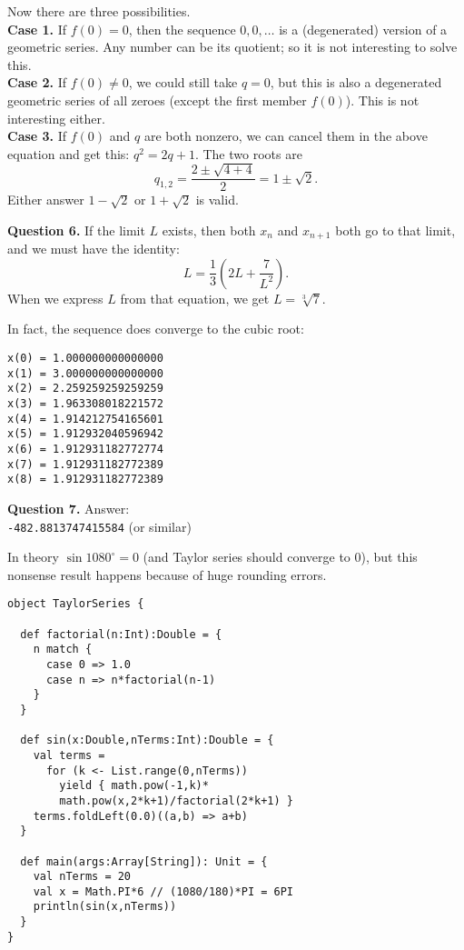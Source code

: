 \documentclass[jou]{apa6}
\begin{document}
Now there are three possibilities.\\
{\bf Case 1.} If $f(0) = 0$, then the sequence 
$0,0,\ldots$ is a (degenerated) version of a geometric series. 
Any number can be its quotient; so it is not interesting to solve this.\\
{\bf Case 2.} If $f(0) \neq 0$, we could still take $q = 0$, but this
is also a degenerated geometric series of all zeroes (except the first member $f(0)$).
This is not interesting either.\\
{\bf Case 3.} If $f(0)$ and $q$ are both nonzero, we can cancel them in the
above equation and get this: $q^2 = 2q + 1$. 
The two roots are 
$$q_{1,2} = \frac{2 \pm \sqrt{4 + 4}}{2} = 1 \pm \sqrt{2}.$$
Either answer $1 - \sqrt{2}$ or $1 + \sqrt{2}$ is valid. 




\vspace{6pt}
{\bf Question 6.} If the limit $L$ exists, then both $x_n$ and $x_{n+1}$ both 
go to that limit, and we must have the identity:
$$L = \frac{1}{3}\left( 2L + \frac{7}{L^2} \right).$$
When we express $L$ from that equation, we get $L = \sqrt[3]{7}$. 

In fact, the sequence does converge to the cubic root: 
\begin{verbatim}
x(0) = 1.000000000000000
x(1) = 3.000000000000000
x(2) = 2.259259259259259
x(3) = 1.963308018221572
x(4) = 1.914212754165601
x(5) = 1.912932040596942
x(6) = 1.912931182772774
x(7) = 1.912931182772389
x(8) = 1.912931182772389
\end{verbatim}


\vspace{6pt}
{\bf Question 7.} Answer:\\ {\tt -482.8813747415584} (or similar)

In theory $\sin 1080^{\circ} = 0$ (and Taylor series should converge to $0$), 
but this nonsense result happens because of huge rounding errors.

{\footnotesize
\begin{verbatim}
object TaylorSeries {

  def factorial(n:Int):Double = {
    n match {
      case 0 => 1.0
      case n => n*factorial(n-1)
    }
  }
    
  def sin(x:Double,nTerms:Int):Double = {
    val terms = 
      for (k <- List.range(0,nTerms)) 
        yield { math.pow(-1,k)*
        math.pow(x,2*k+1)/factorial(2*k+1) } 
    terms.foldLeft(0.0)((a,b) => a+b)
  }
  
  def main(args:Array[String]): Unit = {
    val nTerms = 20
    val x = Math.PI*6 // (1080/180)*PI = 6PI 
    println(sin(x,nTerms))
  }
}
\end{verbatim}
}
\end{document}
